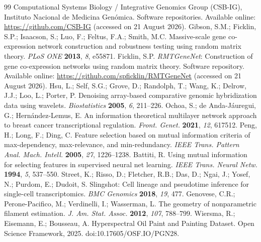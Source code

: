 \documentclass[11pt]{article}
\begin{document}
\begin{thebibliography}{99}
Computational Systems Biology / Integrative Genomics Group (CSB-IG), Instituto Nacional de Medicina Gen\'{o}mica. Software repositories. Available online: \url{https://github.com/CSB-IG} (accessed on 21 August 2026).
Gibson, S.M.; Ficklin, S.P.; Isaacson, S.; Luo, F.; Feltus, F.A.; Smith, M.C. Massive-scale gene co-expression network construction and robustness testing using random matrix theory. \textit{PLoS ONE} \textbf{2013}, \textit{8}, e55871.
Ficklin, S.P. \textit{RMTGeneNet}: Construction of gene co-expression networks using random matrix theory. Software repository. Available online: \url{https://github.com/spficklin/RMTGeneNet} (accessed on 21 August 2026).
Hsu, L.; Self, S.G.; Grove, D.; Randolph, T.; Wang, K.; Delrow, J.J.; Loo, L.; Porter, P. Denoising array-based comparative genomic hybridization data using wavelets. \textit{Biostatistics} \textbf{2005}, \textit{6}, 211--226.
Ochoa, S.; de Anda-J\'{a}uregui, G.; Hern\'{a}ndez-Lemus, E. An information theoretical multilayer network approach to breast cancer transcriptional regulation. \textit{Front. Genet.} \textbf{2021}, \textit{12}, 617512.
Peng, H.; Long, F.; Ding, C. Feature selection based on mutual information criteria of max-dependency, max-relevance, and min-redundancy. \textit{IEEE Trans. Pattern Anal. Mach. Intell.} \textbf{2005}, \textit{27}, 1226--1238.
Battiti, R. Using mutual information for selecting features in supervised neural net learning. \textit{IEEE Trans. Neural Netw.} \textbf{1994}, \textit{5}, 537--550.
Street, K.; Risso, D.; Fletcher, R.B.; Das, D.; Ngai, J.; Yosef, N.; Purdom, E.; Dudoit, S. Slingshot: Cell lineage and pseudotime inference for single-cell transcriptomics. \textit{BMC Genomics} \textbf{2018}, \textit{19}, 477.
Genovese, C.R.; Perone-Pacifico, M.; Verdinelli, I.; Wasserman, L. The geometry of nonparametric filament estimation. \textit{J. Am. Stat. Assoc.} \textbf{2012}, \textit{107}, 788--799.
Wiersma, R.; Eisemann, E.; Bousseau, A. Hyperspectral Oil Paint and Painting Dataset. Open Science Framework, 2025. doi:10.17605/OSF.IO/PGN28.
\end{thebibliography}
\end{document}
